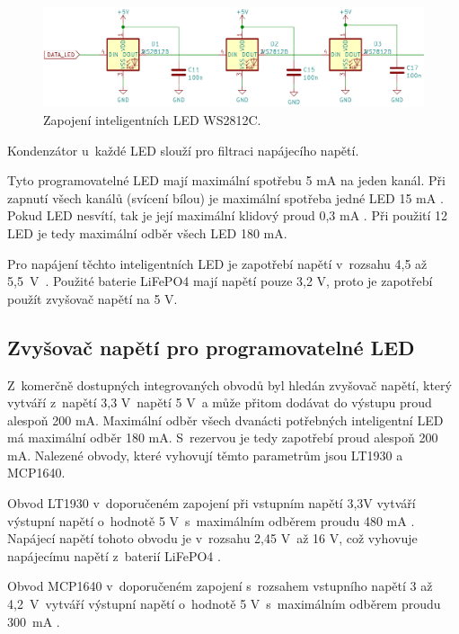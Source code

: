 \begin{figure}[!h]
  \begin{center}
    \includegraphics[scale=0.5]{obrazky/WS2812C.png}
  \end{center}
  \caption[Zapojení inteligentních LED WS2812C]{Zapojení inteligentních LED WS2812C.}
\end{figure}

Kondenzátor u~každé LED slouží pro filtraci napájecího napětí. 

Tyto programovatelné LED mají maximální spotřebu 5 mA na jeden kanál. Při zapnutí všech kanálů (svícení bílou) je maximální
spotřeba jedné LED 15 mA \cite{WS2812C_dtsh}. Pokud LED nesvítí, tak je její maximální klidový proud 0,3 mA \cite{WS2812C_dtsh}.
Při použití 12 LED je tedy maximální odběr všech LED 180 mA.

Pro napájení těchto inteligentních LED je zapotřebí napětí v~rozsahu 4,5 až 5,5~V~\cite{WS2812C_dtsh}. 
Použité baterie LiFePO4 mají napětí pouze 3,2 V, proto je zapotřebí použít zvyšovač napětí na 5 V. 

\subsection{Zvyšovač napětí pro programovatelné LED}
Z~komerčně dostupných integrovaných obvodů byl hledán zvyšovač napětí, který vytváří z~napětí 3,3 V~napětí 5 V~a může přitom dodávat do výstupu proud alespoň 200 mA. 
Maximální odběr všech dvanácti potřebných inteligentní LED má maximální odběr 180 mA. S~rezervou je tedy zapotřebí proud alespoň 200 mA. Nalezené obvody, které vyhovují 
těmto parametrům jsou LT1930 a MCP1640. 

Obvod LT1930 v~doporučeném zapojení při vstupním napětí 3,3V vytváří výstupní napětí o~hodnotě 5 V~s~maximálním odběrem proudu 480 mA \cite{LT1930_dtsh}. Napájecí napětí 
tohoto obvodu je v~rozsahu 2,45 V~až 16 V, což vyhovuje napájecímu napětí z~baterií LiFePO4 \cite{LT1930_dtsh}.

Obvod MCP1640 v~doporučeném zapojení s~rozsahem vstupního napětí 3 až 4,2~V~vytváří výstupní napětí o~hodnotě 5 V~s~maximálním odběrem proudu 300~mA \cite{MCP1640_dtsh}.

